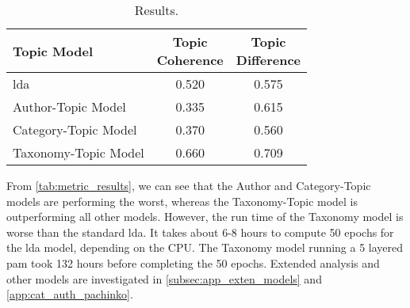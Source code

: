 \begin{table}[h]
	\centering
	\caption{Results.}
	\begin{tabular}{l|c|c}
		Topic Model & \makecell{Topic \\ Coherence} & \makecell{Topic \\ Difference} \\
		\midrule
		\Acrlong{lda} & 0.520 & 0.575 \\
		Author-Topic Model & 0.335 & 0.615 \\
		Category-Topic Model & 0.370 & 0.560 \\
		Taxonomy-Topic Model & 0.660 & 0.709 \\
	\end{tabular}
	\label{tab:metric_results}
\end{table}

From \autoref{tab:metric_results}, we can see that the Author and Category-Topic models are performing the worst, whereas the Taxonomy-Topic model is outperforming all other models.
However, the run time of the Taxonomy model is worse than the standard \gls{lda}.
It takes about 6-8 hours to compute 50 epochs for the \gls{lda} model, depending on the CPU. 
The Taxonomy model running a 5 layered \gls{pam} took 132 hours before completing the 50 epochs.
Extended analysis and other models are investigated in \autoref{subsec:app_exten_models} and \autoref{app:cat_auth_pachinko}.
